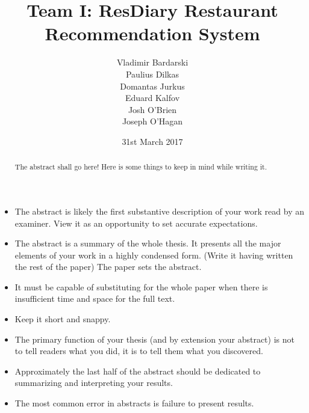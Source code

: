 \documentclass{l3proj}
\begin{document}
\title{Team I: ResDiary Restaurant Recommendation System}

\author{Vladimir Bardarski \\
        Paulius Dilkas \\
        Domantas Jurkus \\
        Eduard Kalfov \\
        Josh O'Brien \\
		Joseph O'Hagan}

\date{31st March 2017}

\maketitle

\begin{abstract}
The abstract shall go here! Here is some things to keep in mind while writing it.
\end{abstract}

\begin{itemize}
\item The abstract is likely the first substantive description of your work read by an examiner. View it as an opportunity to set accurate expectations.
\item The abstract is a summary of the whole thesis. It presents all the major elements of your work in a highly condensed form. (Write it having written the rest of the paper) The paper sets the abstract.
\item It must be capable of substituting for the whole paper when there is insufficient time and space for the full text.
\item Keep it short and snappy. 
\item The primary function of your thesis (and by extension your abstract) is not to tell readers what you did, it is to tell them what you discovered.
\item Approximately the last half of the abstract should be dedicated to summarizing and interpreting your results.
\item The most common error in abstracts is failure to present results.
\end{itemize}

\educationalconsent
\newpage
\end{document}
